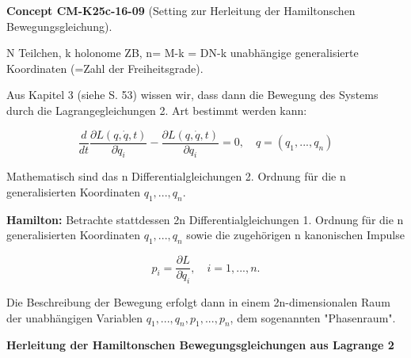 \documentclass[10pt, letterpaper]{article}
\newcommand{\CustomHeading}[3]{%
  \par\medskip\noindent%
  \textbf{#1 #2} \textnormal{(#3)}.\enskip%
}
\newenvironment{CONC}[2]{\begin{unitbox}\CustomHeading{Concept}{#1}{#2}}{\end{unitbox}}
\begin{document}
\begin{CONC}{CM-K25c-16-09}{Setting zur Herleitung der Hamiltonschen Bewegungsgleichung}
N Teilchen, k holonome ZB, n= M-k = DN-k unabhängige generalisierte Koordinaten (=Zahl der Freiheitsgrade).

Aus Kapitel 3 (siehe S. 53) wissen wir, dass dann die Bewegung des Systems durch die Lagrangegleichungen 2. Art bestimmt werden kann:

\[
\frac{d}{dt} \frac{\partial L(q,\dot{q},t)}{\partial \dot{q}_i} - \frac{\partial L(q,\dot{q},t)}{\partial q_i} = 0, \quad q=(q_1,...,q_n)
\]

Mathematisch sind das n Differentialgleichungen 2. Ordnung für die n generalisierten Koordinaten $q_1,...,q_n$.

\textbf{Hamilton:} Betrachte stattdessen 2n Differentialgleichungen 1. Ordnung für die n generalisierten Koordinaten $q_1,...,q_n$ sowie die zugehörigen n kanonischen Impulse

\[
p_i = \frac{\partial L}{\partial \dot{q}_i}, \quad i=1,...,n.
\]

Die Beschreibung der Bewegung erfolgt dann in einem 2n-dimensionalen Raum der unabhängigen Variablen $q_1,...,q_n,p_1,...,p_n$, dem sogenannten "Phasenraum".
\end{CONC}





\textbf{Herleitung der Hamiltonschen Bewegungsgleichungen aus Lagrange 2}
\end{document}
